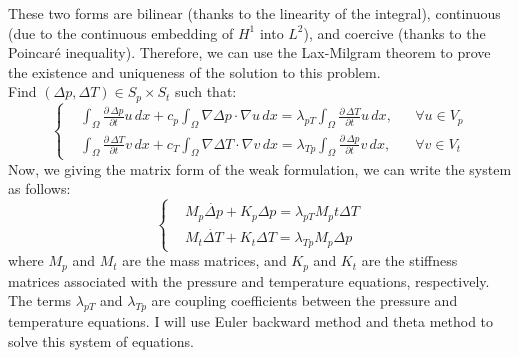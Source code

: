 \documentclass[a4paper,12pt]{report}
\begin{document}
These two forms are bilinear (thanks to the linearity of the integral), continuous (due to the continuous embedding of $H^1$ into $L^2$), and coercive (thanks to the Poincaré inequality). Therefore, we can use the Lax-Milgram theorem to prove the existence and uniqueness of the solution to this problem.\\
Find $(\Delta p, \Delta T) \in S_p \times S_t$ such that:
\begin{equation}
\left\{
\begin{aligned}
    &\int_{\Omega} \frac{\partial\, \Delta p}{\partial t} u \,dx + c_p \int_{\Omega} \nabla \Delta p \cdot \nabla u \,dx  = \lambda_{pT} \int_{\Omega} \frac{\partial\, \Delta T}{\partial t} u \,dx,  && \forall u \in V_p \\[2mm]
    &\int_{\Omega} \frac{\partial\, \Delta T}{\partial t} v \,dx + c_T \int_{\Omega} \nabla \Delta T \cdot \nabla v \,dx  = \lambda_{Tp} \int_{\Omega} \frac{\partial\, \Delta p}{\partial t} v \,dx, && \forall v \in V_t
\end{aligned}
\right.
\end{equation}
Now, we giving the matrix form of the weak formulation, we can write the system as follows:
\begin{equation}
\left\{
\begin{aligned}
    & M_p \dot{\Delta p} + K_p \Delta p = \lambda_{pT} M_pt \Delta T \\[2mm]
    & M_t \dot{\Delta T} + K_t \Delta T = \lambda_{Tp} M_p \Delta p
\end{aligned}
\right.
\end{equation}
where $M_p$ and $M_t$ are the mass matrices, and $K_p$ and $K_t$ are the stiffness 
matrices associated with the pressure and temperature equations, respectively. 
The terms $\lambda_{pT}$ and $\lambda_{Tp}$ are coupling coefficients 
between the pressure and temperature equations. I will use Euler backward method and theta method to solve this system of equations.\\
\end{document}
